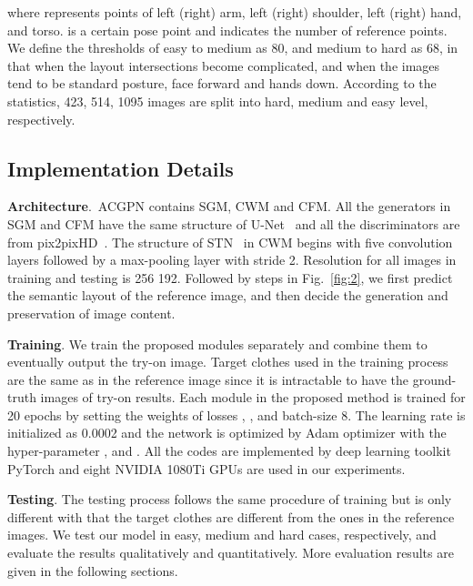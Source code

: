 \documentclass[10pt,twocolumn,letterpaper]{article}
\begin{document}
where  represents points of left (right) arm, left (right) shoulder, left (right) hand, and torso.  is a certain pose point and  indicates the number of reference points. We define the thresholds of easy to medium as 80, and medium to hard as 68, in that when  the layout intersections become complicated, and when  the images tend to be standard posture, face forward and hands down. According to the statistics, 423, 514, 1095 images are split into hard, medium and easy level, respectively.
\vspace{-5pt}



\subsection{Implementation Details}

\textbf{Architecture}.~ACGPN contains SGM, CWM and CFM. All the generators in SGM and CFM have the same structure of U-Net~\cite{ronneberger2015u} and all the discriminators are from pix2pixHD~\cite{DBLP:conf/cvpr/Wang0ZTKC18}. The structure of STN~\cite{jaderberg2015spatial} in CWM begins with five convolution layers followed by a max-pooling layer with stride 2. Resolution for all images in training and testing is 256  192. Followed by steps in Fig.~\ref{fig:2}, we first predict the semantic layout of the reference image, and then decide the generation and preservation of image content. 

\textbf{Training}.
We train the proposed modules separately and combine them to eventually output the try-on image. Target clothes used in the training process are the same as in the reference image since it is intractable to have the ground-truth images of try-on results. Each module in the proposed method is trained for 20 epochs by setting the weights of losses , , and batch-size 8. The learning rate is initialized as 0.0002 and the network is optimized by Adam optimizer with the hyper-parameter , and . All the codes are implemented by deep learning toolkit PyTorch and eight NVIDIA 1080Ti GPUs are used in our experiments.

\textbf{Testing}.
The testing process follows the same procedure of training but is only different with that the target clothes are different from the ones in the reference images. We test our model in easy, medium and hard cases, respectively, and evaluate the results qualitatively and quantitatively. More evaluation results are given in the following sections.
\end{document}
